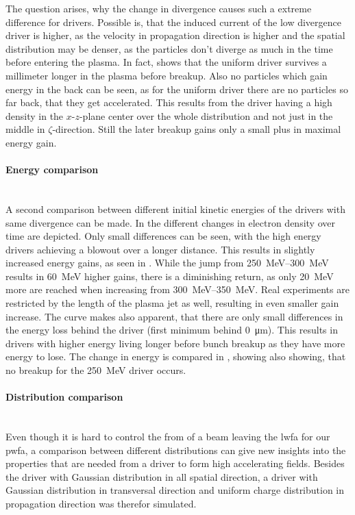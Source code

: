 \documentclass[bachelor_thesis]{subfiles}
\begin{document}
The question arises, why the change in divergence causes such a extreme difference for drivers. Possible is, that the induced current of the low divergence driver is higher, as the velocity in propagation direction is higher and the spatial distribution
may be denser, as the particles don't diverge as much in the time before entering the plasma. In fact,  shows that the uniform driver survives a millimeter longer in the plasma before breakup.
Also no particles which gain energy in the back can be seen, as for the uniform driver there are no particles so far back, that they get accelerated. This results from the driver having a high density in the $x$-$z$-plane center over the whole distribution and not just
in the middle in $\zeta$-direction. Still the later breakup gains only a small plus in maximal energy gain.

\paragraph*{Energy comparison}\hspace{0pt} \\
A second comparison between different initial kinetic energies of the drivers with same divergence can be made. In the different changes in electron density over time are depicted. Only small differences can be seen,
with the high energy drivers achieving a blowout over a longer distance. This results in slightly increased energy gains, as seen in . While the jump from \qtyrange{250}{300}{\MeV} results in \qty{60}{\MeV} higher gains,
there is a diminishing return, as only \qty{20}{\MeV} more are reached when increasing from \qtyrange{300}{350}{\MeV}. Real experiments are restricted by the length of the plasma jet as well, resulting in even smaller gain increase.
The curve makes also apparent, that there are only small differences in the energy loss behind the driver (first minimum behind \qty{0}{\um}). This results in drivers with higher energy living longer before bunch breakup as they have more energy to lose.
The change in energy is compared in , showing also showing, that no breakup for the \qty{250}{\MeV} driver occurs.

\paragraph*{Distribution comparison}\hspace{0pt} \\
Even though it is hard to control the from of a beam leaving the \gls{lwfa} for our \gls{pwfa}, a comparison between different distributions can give new insights into the properties that are needed from a driver
to form high accelerating fields. Besides the driver with Gaussian distribution in all spatial direction, a driver with Gaussian distribution in transversal direction and uniform charge distribution in propagation direction 
was therefor simulated.
\end{document}
